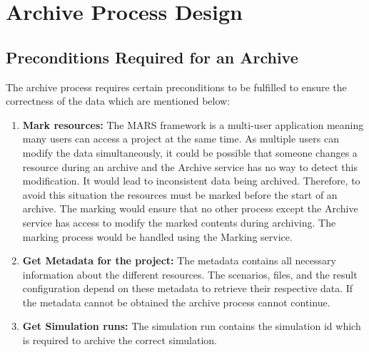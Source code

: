\section{Archive Process Design}
\subsection{Preconditions Required for an Archive}
The archive process requires certain preconditions to be fulfilled to ensure the correctness of the data which are mentioned below:
\begin{enumerate}
    \label{lst:preconditionsArchive}
    \item \textbf{Mark resources:} The MARS framework is a multi-user application meaning many users can access a project at the same time. 
    As multiple users can modify the data simultaneously, it could be possible that someone changes a resource during an archive and the 
    Archive service has no way to detect this modification. It would lead to inconsistent data being archived.
    Therefore, to avoid this situation the resources must be marked before the start of an archive. The marking would ensure that no other process except the Archive
    service has access to modify the marked contents during archiving. The marking process would be handled using the Marking service.
    \item \textbf{Get Metadata for the project:} The metadata contains all necessary information about
    the different resources. The scenarios, files, and the result configuration depend on these metadata
    to retrieve their respective data. If the metadata cannot be obtained the archive process cannot continue.
    \item \textbf{Get Simulation runs:} The simulation run contains the simulation id which is required to archive the correct simulation.
\end{enumerate}

